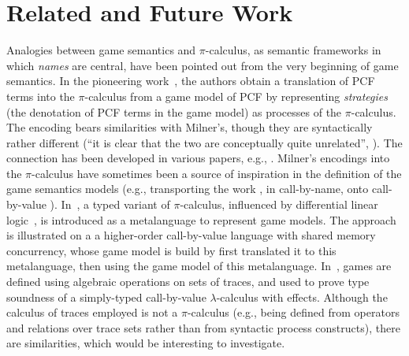 \section{Related and Future Work}
\label{s:cf}
              


Analogies between game semantics and $\pi$-calculus, as semantic frameworks in which
\emph{names} are central, have been pointed out from the very beginning of game
semantics. 
In the pioneering work~\cite{10.1145/224164.224189}, the authors 
obtain 
 a translation of PCF terms into the $\pi$-calculus from 
a game model of PCF by representing 
 \emph{strategies} 
(the denotation of PCF terms in the game model) as processes of the $\pi$-calculus.
The encoding bears similarities with Milner's, though they are syntactically rather
different (``it is clear that the two are conceptually quite unrelated'',
\cite{10.1145/224164.224189}).   The connection has been  developed in various papers,
e.g.,
\cite{DBLP:journals/entcs/Honda02,10.1016/S0304-3975-99-00039-0,10.5555/788020.788890,yoshida2020game,10.1145/3290340}.
Milner's encodings into the $\pi$-calculus have sometimes  been a source of inspiration  in
the definition of the game semantics models (e.g.,  transporting 
 the work 
\cite{10.1145/224164.224189}, in call-by-name, onto call-by-value
 \cite{10.1016/S0304-3975-99-00039-0}).  
In~\cite{yoshida2020game}, a  typed variant of  $\pi$-calculus, influenced by 
differential linear logic~\cite{ehrhard2018introduction},
is introduced as a metalanguage to represent game models.
\iflong 
 The approach is illustrated on a
a higher-order call-by-value language with shared memory concurrency, whose game model is build by first translated it
to this metalanguage, then using the game model of this metalanguage.
\fi
In~\cite{10.1109/LICS.2015.20}, games are defined using algebraic operations on sets of
traces, and used to  prove type soundness of a simply-typed call-by-value
$\lambda$-calculus with effects.
 Although the calculus of traces employed is not a $\pi$-calculus 
(e.g., being defined from operators and relations over trace sets rather than from
syntactic process constructs), there are similarities, which would be interesting to
investigate. 



